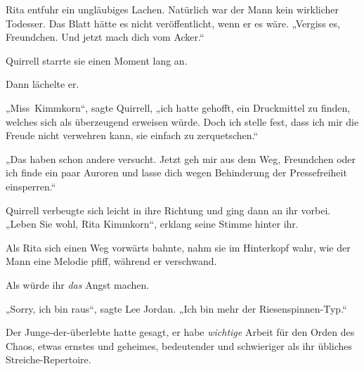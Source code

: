 Rita entfuhr ein ungläubiges Lachen. Natürlich war der Mann kein wirklicher Todesser. Das Blatt hätte es nicht veröffentlicht, wenn er es wäre. „Vergiss es, Freundchen. Und jetzt mach dich vom Acker.“

Quirrell starrte sie einen Moment lang an.

Dann lächelte er.

„Miss~Kimmkorn“, sagte Quirrell, „ich hatte gehofft, ein Druckmittel zu finden, welches sich als überzeugend erweisen würde. Doch ich stelle fest, dass ich mir die Freude nicht verwehren kann, sie einfach zu zerquetschen.“

„Das haben schon andere versucht. Jetzt geh mir aus dem Weg, Freundchen oder ich finde ein paar Auroren und lasse dich wegen Behinderung der Pressefreiheit einsperren.“

Quirrell verbeugte sich leicht in ihre Richtung und ging dann an ihr vorbei. „Leben Sie wohl, Rita Kimmkorn“, erklang seine Stimme hinter ihr.

Als Rita sich einen Weg vorwärts bahnte, nahm sie im Hinterkopf wahr, wie der Mann eine Melodie pfiff, während er verschwand.

Als würde ihr \emph{das} Angst machen.


„Sorry, ich bin raus“, sagte Lee Jordan. „Ich bin mehr der Riesenspinnen-Typ.“

Der Junge-der-überlebte hatte gesagt, er habe \emph{wichtige} Arbeit für den Orden des Chaos, etwas ernstes und geheimes, bedeutender und schwieriger als ihr übliches Streiche-Repertoire.


